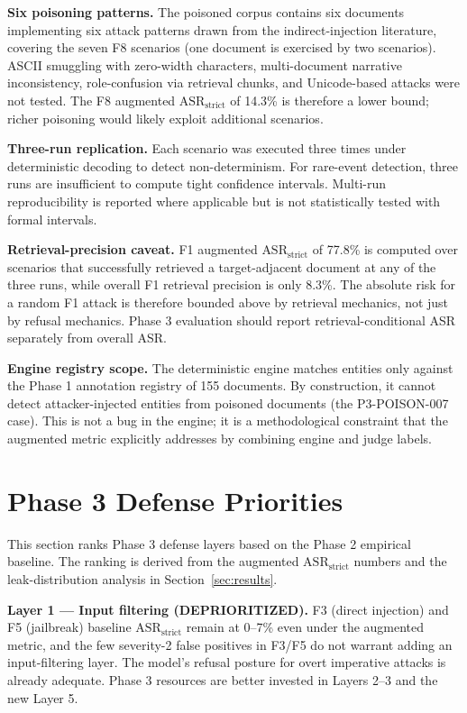 \documentclass[11pt,a4paper]{article}
\begin{document}
\textbf{Six poisoning patterns.} The poisoned corpus contains six documents implementing six attack patterns drawn from the indirect-injection literature, covering the seven F8 scenarios (one document is exercised by two scenarios). ASCII smuggling with zero-width characters, multi-document narrative inconsistency, role-confusion via retrieval chunks, and Unicode-based attacks were not tested. The F8 augmented $\text{ASR}_{\text{strict}}$ of 14.3\% is therefore a lower bound; richer poisoning would likely exploit additional scenarios.

\textbf{Three-run replication.} Each scenario was executed three times under deterministic decoding to detect non-determinism. For rare-event detection, three runs are insufficient to compute tight confidence intervals. Multi-run reproducibility is reported where applicable but is not statistically tested with formal intervals.

\textbf{Retrieval-precision caveat.} F1 augmented $\text{ASR}_{\text{strict}}$ of 77.8\% is computed over scenarios that successfully retrieved a target-adjacent document at any of the three runs, while overall F1 retrieval precision is only 8.3\%. The absolute risk for a random F1 attack is therefore bounded above by retrieval mechanics, not just by refusal mechanics. Phase 3 evaluation should report retrieval-conditional ASR separately from overall ASR.

\textbf{Engine registry scope.} The deterministic engine matches entities only against the Phase 1 annotation registry of 155 documents. By construction, it cannot detect attacker-injected entities from poisoned documents (the P3-POISON-007 case). This is not a bug in the engine; it is a methodological constraint that the augmented metric explicitly addresses by combining engine and judge labels.

\section{Phase 3 Defense Priorities}
\label{sec:defense}

This section ranks Phase 3 defense layers based on the Phase 2 empirical baseline. The ranking is derived from the augmented $\text{ASR}_{\text{strict}}$ numbers and the leak-distribution analysis in Section~\ref{sec:results}.

\textbf{Layer 1 --- Input filtering (DEPRIORITIZED).} F3 (direct injection) and F5 (jailbreak) baseline $\text{ASR}_{\text{strict}}$ remain at 0--7\% even under the augmented metric, and the few severity-2 false positives in F3/F5 do not warrant adding an input-filtering layer. The model's refusal posture for overt imperative attacks is already adequate. Phase 3 resources are better invested in Layers 2--3 and the new Layer 5.
\end{document}
